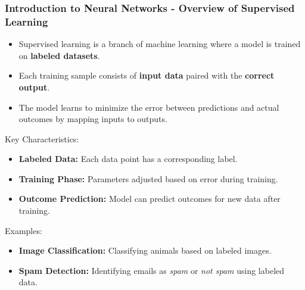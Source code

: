 \documentclass[aspectratio=169]{beamer}
\begin{document}
\frame{\titlepage}

\begin{frame}[fragile]
    \frametitle{Introduction to Neural Networks - Overview of Supervised Learning}
    \begin{itemize}
        \item Supervised learning is a branch of machine learning where a model is trained on \textbf{labeled datasets}.
        \item Each training sample consists of \textbf{input data} paired with the \textbf{correct output}.
        \item The model learns to minimize the error between predictions and actual outcomes by mapping inputs to outputs.
    \end{itemize}
    
    \begin{block}{Key Characteristics:}
        \begin{itemize}
            \item \textbf{Labeled Data:} Each data point has a corresponding label.
            \item \textbf{Training Phase:} Parameters adjusted based on error during training.
            \item \textbf{Outcome Prediction:} Model can predict outcomes for new data after training.
        \end{itemize}
    \end{block}

    \begin{block}{Examples:}
        \begin{itemize}
            \item \textbf{Image Classification:} Classifying animals based on labeled images.
            \item \textbf{Spam Detection:} Identifying emails as \textit{spam} or \textit{not spam} using labeled data.
        \end{itemize}
    \end{block}
\end{frame}
\end{document}
